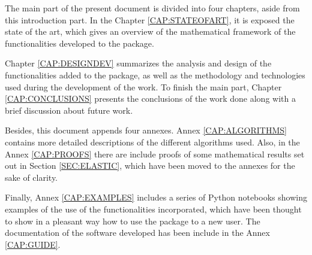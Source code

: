 The main part of the present document is divided into four chapters, aside from this introduction part. In the Chapter \ref{CAP:STATEOFART}, it is exposed the state of the art, which gives an overview of the mathematical framework of the functionalities developed to the package.

Chapter \ref{CAP:DESIGNDEV} summarizes the analysis and design of the functionalities added to the package, as well as the methodology and technologies used during the development of the work. To finish the main part, Chapter \ref{CAP:CONCLUSIONS} presents the conclusions of the work done along with a brief discussion about future work.

Besides, this document appends four annexes. Annex \ref{CAP:ALGORITHMS} contains more detailed descriptions of the different algorithms used. Also, in the Annex \ref{CAP:PROOFS} there are include proofs of some mathematical results set out in Section \ref{SEC:ELASTIC}, which have been moved to the annexes for the sake of clarity.

Finally, Annex \ref{CAP:EXAMPLES} includes a series of Python notebooks showing examples of the use of the functionalities incorporated, which have been thought to show in a pleasant way how to use the package to a new user. The documentation of the software developed has been include in the Annex \ref{CAP:GUIDE}.
